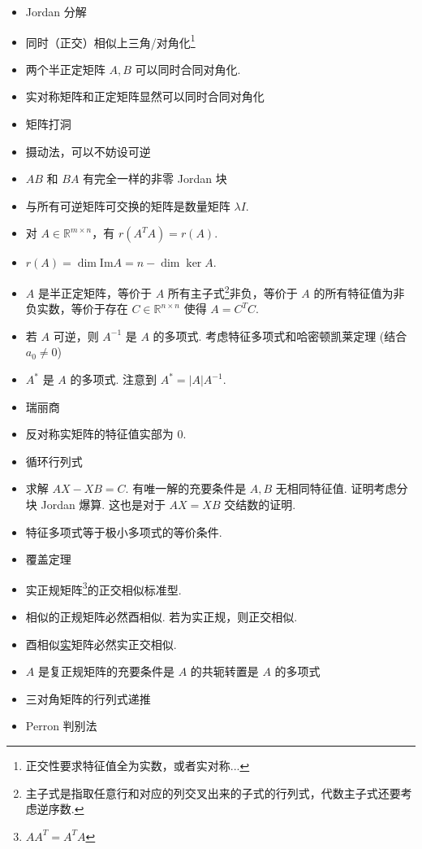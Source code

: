 \begin{itemize}
	\item Jordan 分解
	\item 同时（正交）相似上三角/对角化\footnote{正交性要求特征值全为实数，或者实对称...}
	\item 两个半正定矩阵 $A,B$ 可以同时合同对角化.
	\item 实对称矩阵和正定矩阵显然可以同时合同对角化
	\item 矩阵打洞
	\item 摄动法，可以不妨设可逆
	\item $AB$ 和 $BA$ 有完全一样的非零 Jordan 块
	\item 与所有可逆矩阵可交换的矩阵是数量矩阵 $\lambda I$.
	\item 对 $A\in \mathbb{R}^{m\times n}$，有 $r(A^{T}A)=r(A)$.
	\item $r(A)=\dim \mathrm{Im}A=n-\dim \ker A$.
	\item $A$ 是半正定矩阵，等价于 $A$ 所有主子式\footnote{主子式是指取任意行和对应的列交叉出来的子式的行列式，代数主子式还要考虑逆序数.}非负，等价于 $A$ 的所有特征值为非负实数，等价于存在 $C\in \mathbb{R}^{n\times n}$ 使得 $A=C^{T}C$.
	\item 若 $A$ 可逆，则 $A^{-1}$ 是 $A$ 的多项式. 考虑特征多项式和哈密顿凯莱定理 (结合 $a_0\neq0$)
	\item $A^{*}$ 是 $A$ 的多项式. 注意到 $A^{*}=\lvert A \rvert A^{-1}$.
	\item 瑞丽商
	\item 反对称实矩阵的特征值实部为 0.
	\item 循环行列式
	\item 求解 $AX-XB=C$. 有唯一解的充要条件是 $A,B$ 无相同特征值. 证明考虑分块 Jordan 爆算. 这也是对于 $AX=XB$ 交结数的证明.
	\item 特征多项式等于极小多项式的等价条件.
	\item 覆盖定理
	\item 实正规矩阵\footnote{$AA^{T}=A^{T}A$}的正交相似标准型.
	\item 相似的正规矩阵必然酉相似. 若为实正规，则正交相似.
	\item 酉相似\underline{实}矩阵必然实正交相似.
	\item $A$ 是复正规矩阵的充要条件是 $A$ 的共轭转置是 $A$ 的多项式
	\item 三对角矩阵的行列式递推
	\item Perron 判别法
\end{itemize}

